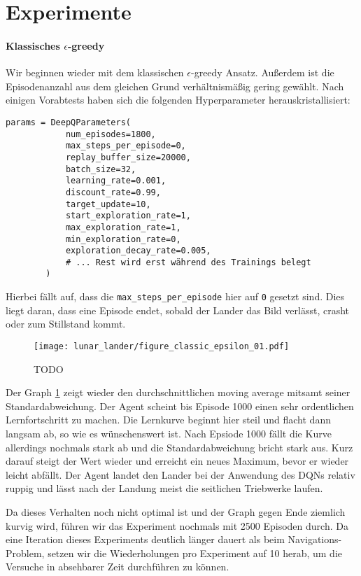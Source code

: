 \section{Experimente}
\paragraph{Klassisches $ \epsilon $-greedy}
Wir beginnen wieder mit dem klassischen $ \epsilon $-greedy Ansatz. Außerdem ist die Episodenanzahl aus dem gleichen Grund verhältnismäßig gering gewählt. Nach einigen Vorabtests haben sich die folgenden Hyperparameter herauskristallisiert:
\begin{verbatim}
params = DeepQParameters(
            num_episodes=1800,
            max_steps_per_episode=0,
            replay_buffer_size=20000,
            batch_size=32,
            learning_rate=0.001,
            discount_rate=0.99,
            target_update=10,
            start_exploration_rate=1,
            max_exploration_rate=1,
            min_exploration_rate=0,
            exploration_decay_rate=0.005,
            # ... Rest wird erst während des Trainings belegt
        )
\end{verbatim}
Hierbei fällt auf, dass die \texttt{max_steps_per_episode} hier auf \texttt{0} gesetzt sind. Dies liegt daran, dass eine Episode endet, sobald der Lander das Bild verlässt, crasht oder zum Stillstand kommt.

\begin{figure}[h!]
    \centering
    \texttt{[image: lunar\_lander/figure\_classic\_epsilon\_01.pdf]}
    \caption{TODO} \label{img:graphClassicEps01}
\end{figure}

Der Graph \ref{img:graphClassicEps01} zeigt wieder den durchschnittlichen moving average mitsamt seiner Standardabweichung. Der Agent scheint bis Episode 1000 einen sehr ordentlichen Lernfortschritt zu machen. Die Lernkurve beginnt hier steil und flacht dann langsam ab, so wie es wünschenswert ist. Nach Epsiode 1000 fällt die Kurve allerdings nochmals stark ab und die Standardabweichung bricht stark aus. Kurz darauf steigt der Wert wieder und erreicht ein neues Maximum, bevor er wieder leicht abfällt. Der Agent landet den Lander bei der Anwendung des DQNs relativ ruppig und lässt nach der Landung meist die seitlichen Triebwerke laufen.

Da dieses Verhalten noch nicht optimal ist und der Graph gegen Ende ziemlich kurvig wird, führen wir das Experiment nochmals mit 2500 Episoden durch. Da eine Iteration dieses Experiments deutlich länger dauert als beim Navigations-Problem, setzen wir die Wiederholungen pro Experiment auf 10 herab, um die Versuche in absehbarer Zeit durchführen zu können.

